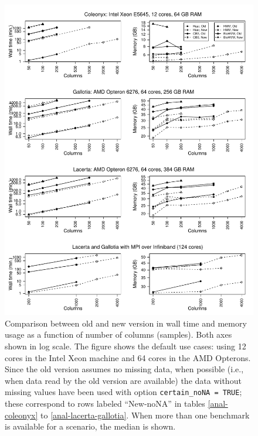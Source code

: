 \documentclass[a4paper,11pt]{article}
\begin{document}
\clearpage
\begin{figure}[h!]
\begin{center}
  \includegraphics[width=16.1cm,keepaspectratio]{anal-benchmark-fig.pdf}
\end{center}
\caption[Wall time and memory usage when analyzing data: version
comparison]{\label{fig-anal} Comparison between old and new version in
  wall time and memory usage as a function of number of columns
  (samples). Both axes shown in log scale. The figure shows the default
  use cases: using 12 cores in the Intel Xeon machine and 64 cores in the
  AMD Opterons. Since the old version assumes no missing data, when
  possible (i.e., when data read by the old version are available) the
  data without missing values have been used with option
  \texttt{certain\_noNA = TRUE}; these correspond to rows labeled
  ``New-noNA'' in tables \ref{anal-coleonyx} to
  \ref{anal-lacerta-gallotia}. When more than one benchmark is available
  for a scenario, the median is shown.}
\end{figure}
\end{document}
